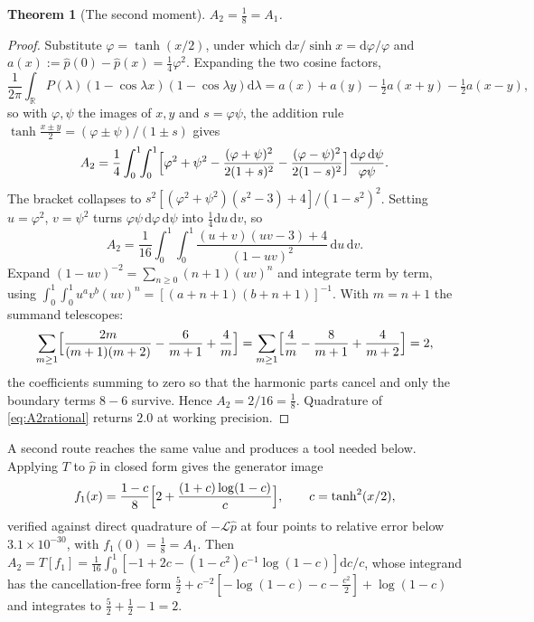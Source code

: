 \documentclass[12pt,a4paper]{article}
\theoremstyle{plain}
\newtheorem{theorem}{Theorem}[section]
\theoremstyle{definition}
\theoremstyle{remark}
\newcommand{\R}{\mathbb{R}}
\newcommand{\dd}{\mathrm{d}}
\begin{document}
\begin{theorem}[The second moment]
\label{thm:A2}
$A_2=\tfrac18=A_1$.
\end{theorem}

\begin{proof}
Substitute $\varphi=\tanh(x/2)$, under which
$\dd x/\sinh x=\dd\varphi/\varphi$ and
$a(x):=\hat p(0)-\hat p(x)=\tfrac14\varphi^2$. Expanding the two cosine
factors,
\begin{equation}
\frac{1}{2\pi}\int_\R P(\lambda)(1-\cos\lambda x)(1-\cos\lambda y)\dd\lambda
=a(x)+a(y)-\tfrac12 a(x+y)-\tfrac12 a(x-y),
\end{equation}
so with $\varphi,\psi$ the images of $x,y$ and $s=\varphi\psi$, the
addition rule $\tanh\frac{x\pm y}{2}=(\varphi\pm\psi)/(1\pm s)$ gives
\begin{equation}
A_2=\frac14\int_0^1\!\!\int_0^1
\Bigl[\varphi^2+\psi^2-\frac{(\varphi+\psi)^2}{2(1+s)^2}
-\frac{(\varphi-\psi)^2}{2(1-s)^2}\Bigr]\frac{\dd\varphi\,\dd\psi}{\varphi\psi} .
\end{equation}
The bracket collapses to
$s^2[(\varphi^2+\psi^2)(s^2-3)+4]/(1-s^2)^2$. Setting $u=\varphi^2$,
$v=\psi^2$ turns $\varphi\psi\,\dd\varphi\,\dd\psi$ into
$\tfrac14\dd u\,\dd v$, so
\begin{equation}
A_2=\frac{1}{16}\int_0^1\!\!\int_0^1
\frac{(u+v)(uv-3)+4}{(1-uv)^2}\,\dd u\,\dd v .
\label{eq:A2rational}
\end{equation}
Expand $(1-uv)^{-2}=\sum_{n\ge0}(n+1)(uv)^n$ and integrate term by
term, using $\int_0^1\!\int_0^1 u^av^b(uv)^n=[(a{+}n{+}1)(b{+}n{+}1)]^{-1}$.
With $m=n+1$ the summand telescopes:
\begin{equation}
\sum_{m\ge1}\Bigl[\frac{2m}{(m+1)(m+2)}-\frac{6}{m+1}+\frac4m\Bigr]
=\sum_{m\ge1}\Bigl[\frac4m-\frac{8}{m+1}+\frac{4}{m+2}\Bigr]=2 ,
\end{equation}
the coefficients summing to zero so that the harmonic parts cancel and
only the boundary terms $8-6$ survive. Hence $A_2=2/16=\tfrac18$.
Quadrature of \eqref{eq:A2rational} returns $2.0$ at working precision.
\end{proof}

A second route reaches the same value and produces a tool needed below.
Applying $T$ to $\hat p$ in closed form gives the generator image
\begin{equation}
f_1(x)=\frac{1-c}{8}\Bigl[2+\frac{(1+c)\log(1-c)}{c}\Bigr],
\qquad c=\tanh^2(x/2),
\label{eq:f1closed}
\end{equation}
verified against direct quadrature of $-\mathcal L\hat p$ at four points
to relative error below $3.1\times10^{-30}$, with $f_1(0)=\tfrac18=A_1$.
Then $A_2=T[f_1]=\tfrac{1}{16}\int_0^1[-1+2c-(1-c^2)c^{-1}\log(1-c)]\dd c/c$,
whose integrand has the cancellation-free form
$\tfrac52+c^{-2}[-\log(1-c)-c-\tfrac{c^2}{2}]+\log(1-c)$ and integrates
to $\tfrac52+\tfrac12-1=2$.
\end{document}
